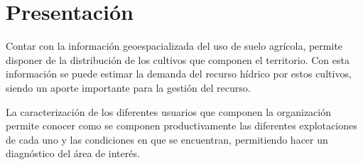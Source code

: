 \documentclass[10pt]{article}
\begin{document}
\section{Presentación}



Contar con la información geoespacializada del uso de suelo agrícola, permite disponer de la distribución de los cultivos que componen el territorio. Con esta información se puede estimar la demanda del recurso hídrico por estos cultivos, siendo un aporte importante para la gestión del recurso.\bigskip\setlength{\parindent}{0pt}

La caracterización de los diferentes usuarios que componen la organización permite conocer como se componen productivamente las diferentes explotaciones de cada uno y las condiciones en que se encuentran, permitiendo hacer un diagnóstico del área de interés.\bigskip\setlength{\parindent}{0pt}
\end{document}
